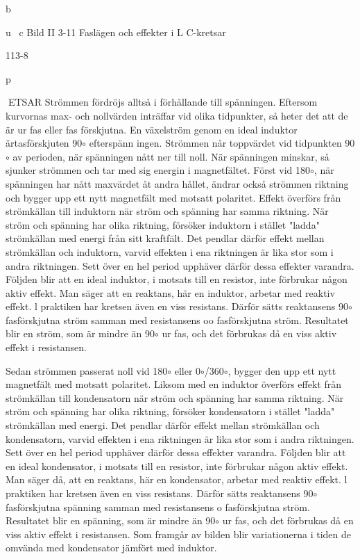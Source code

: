 \documentclass[a4paper,twoside,twocolumn,openright]{book}
\begin{document}
{{{{{b

u~
c
Bild II 3-11 Faslägen och effekter i L C-kretsar

113-8

p

ETSAR
Strömmen fördröjs alltså i förhållande till
spänningen. Eftersom kurvornas max- och
nollvärden inträffar vid olika tidpunkter, så
heter det att de är ur fas eller fas förskjutna.
En växelström genom en ideal induktor
ärtasförskjuten 90$\circ$ efterspänn ingen. Strömmen når toppvärdet vid tidpunkten 90$\circ$ av
perioden, när spänningen nått ner till noll.
När spänningen minskar, så sjunker strömmen och tar med sig energin i magnetfältet.
Först vid 180$\circ$, när spänningen har nått maxvärdet åt andra hållet, ändrar också strömmen riktning och bygger upp ett nytt magnetfält med motsatt polaritet.
Effekt överförs från strömkällan till induktorn när ström och spänning har samma riktning. När ström och spänning har olika riktning, försöker induktorn i stället "ladda" strömkällan med energi från sitt kraftfält. Det pendlar därför effekt mellan strömkällan och induktorn, varvid effekten i ena riktningen är
lika stor som i andra riktningen.
Sett över en hel period upphäver därför
dessa effekter varandra. Följden blir att en
ideal induktor, i motsats till en resistor, inte
förbrukar någon aktiv effekt. Man säger att
en reaktans, här en induktor, arbetar med
reaktiv effekt.
l praktiken har kretsen även en viss resistans. Därför sätts reaktansens 90$\circ$ fasförskjutna ström samman med resistansens oo
fasförskjutna ström. Resultatet blir en ström,
som är mindre än 90$\circ$ ur fas, och det förbrukas då en viss aktiv effekt i resistansen.

Sedan strömmen passerat noll vid 180$\circ$ eller
0$\circ$/360$\circ$, bygger den upp ett nytt magnetfält
med motsatt polaritet.
Liksom med en induktor överförs effekt
från strömkällan till kondensatorn när ström
och spänning har samma riktning. När ström
och spänning har olika riktning, försöker
kondensatorn i stället "ladda" strömkällan
med energi. Det pendlar därför effekt mellan
strömkällan och kondensatorn, varvid effekten i ena riktningen är lika stor som i andra
riktningen.
Sett över en hel period upphäver därför
dessa effekter varandra. Följden blir att en
ideal kondensator, i motsats till en resistor,
inte förbrukar någon aktiv effekt. Man säger
då, att en reaktans, här en kondensator,
arbetar med reaktiv effekt.
l praktiken har kretsen även en viss resistans. Därför sätts reaktansens 90$\circ$ fasförskjutna spänning samman med resistansens o fasförskjutna ström. Resultatet blir en
spänning, som är mindre än 90$\circ$ ur fas, och
det förbrukas då en viss aktiv effekt i resistansen. Som framgår av bilden blir variationerna i tiden de omvända med kondensator
jämfört med induktor.

}}}}}
\end{document}
